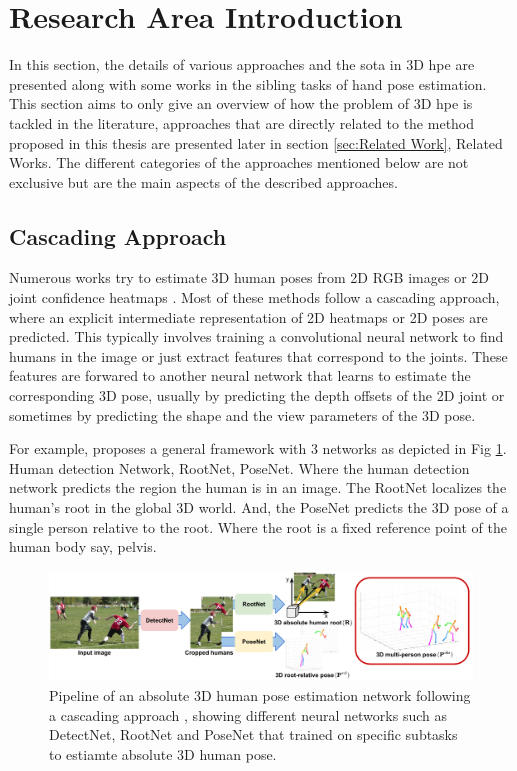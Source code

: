 \section{Research Area Introduction}
\label{sec:Research area introduction}

In this section, the details of various approaches and the \ac{sota} in 3D \ac{hpe} are presented along with some works in the sibling tasks of hand pose estimation. This section aims to only give an overview of how the problem of 3D \ac{hpe} is tackled in the literature, approaches that are directly related to the method proposed in this thesis are presented later in section \ref{sec:Related Work}, Related Works. The different categories of the approaches mentioned below are not exclusive but are the main aspects of the described approaches.

\subsection{Cascading Approach}

Numerous works try to estimate 3D human poses from 2D RGB images or 2D joint confidence heatmaps \cite{CameraDistanceAware, poselifter, DistillNRSfM, occlusionVideo, ordinalranking}. Most of these methods follow a cascading approach, where an explicit intermediate representation of 2D heatmaps or 2D poses are predicted. This typically involves training a convolutional neural network to find humans in the image or just extract features that correspond to the joints. These features are forwared to another neural network that learns to estimate the corresponding 3D pose, usually by predicting the depth offsets of the 2D joint or sometimes by predicting the shape and the view parameters of the 3D pose.

For example, \cite{CameraDistanceAware} proposes a general framework with 3 networks as depicted in Fig \ref{fig:CameraDistanceAware}. Human detection Network, RootNet, PoseNet. Where the human detection network predicts the region the human is in an image. The RootNet localizes the human's root in the global 3D world. And, the PoseNet predicts the 3D pose of a single person relative to the root. Where the root is a fixed reference point of the human body say, pelvis.

\begin{figure}[!h]
    \centering
    \includegraphics[width=\linewidth]{figures/background/cascading_arch.pdf}
    \caption{Pipeline of an absolute 3D human pose estimation network following a cascading approach \cite{CameraDistanceAware}, showing different neural networks such as DetectNet, RootNet and PoseNet that trained on specific subtasks to estiamte absolute 3D human pose.}
    \label{fig:CameraDistanceAware}
\end{figure}

